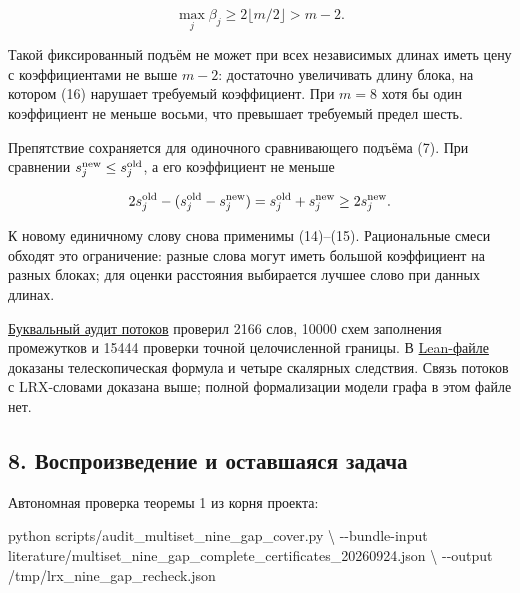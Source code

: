 \documentclass[
  11pt,
  a4paper,
]{article}
\newenvironment{Shaded}{}{}
\newcommand{\AttributeTok}[1]{\textcolor[rgb]{0.49,0.56,0.16}{#1}}
\newcommand{\DataTypeTok}[1]{\textcolor[rgb]{0.56,0.13,0.00}{#1}}
\newcommand{\ExtensionTok}[1]{#1}
\newcommand{\NormalTok}[1]{#1}
\begin{document}
\[\boxed{\max_j\beta_j\ge2\lfloor m/2\rfloor>m-2.}\tag{16}\]

Такой фиксированный подъём не может при всех независимых длинах иметь
цену с коэффициентами не выше \(m-2\): достаточно увеличивать длину
блока, на котором (16) нарушает требуемый коэффициент. При \(m=8\) хотя
бы один коэффициент не меньше восьми, что превышает требуемый предел
шесть.

Препятствие сохраняется для одиночного сравнивающего подъёма (7). При
сравнении \(s_j^{\rm new}\le s_j^{\rm old}\), а его коэффициент не
меньше

\[2s_j^{\rm old}-(s_j^{\rm old}-s_j^{\rm new})
=s_j^{\rm old}+s_j^{\rm new}\ge2s_j^{\rm new}.\]

К новому единичному слову снова применимы (14)--(15). Рациональные смеси
обходят это ограничение: разные слова могут иметь большой коэффициент на
разных блоках; для оценки расстояния выбирается лучшее слово при данных
длинах.

\href{literature/multiset_zero_flux_audit_20260924.json}{Буквальный
аудит потоков} проверил 2166 слов, 10000 схем заполнения промежутков и
15444 проверки точной целочисленной границы. В
\href{lean/MultisetZeroFlux.lean}{Lean-файле} доказаны телескопическая
формула и четыре скалярных следствия. Связь потоков с LRX-словами
доказана выше; полной формализации модели графа в этом файле нет.

\newpage

\hypertarget{ux432ux43eux441ux43fux440ux43eux438ux437ux432ux435ux434ux435ux43dux438ux435-ux438-ux43eux441ux442ux430ux432ux448ux430ux44fux441ux44f-ux437ux430ux434ux430ux447ux430}{%
\subsection{8. Воспроизведение и оставшаяся
задача}\label{ux432ux43eux441ux43fux440ux43eux438ux437ux432ux435ux434ux435ux43dux438ux435-ux438-ux43eux441ux442ux430ux432ux448ux430ux44fux441ux44f-ux437ux430ux434ux430ux447ux430}}

Автономная проверка теоремы 1 из корня проекта:

\begin{Shaded}
\begin{Highlighting}[]
\ExtensionTok{python}\NormalTok{ scripts/audit\_multiset\_nine\_gap\_cover.py }\DataTypeTok{\textbackslash{}}
  \AttributeTok{{-}{-}bundle{-}input}\NormalTok{ literature/multiset\_nine\_gap\_complete\_certificates\_20260924.json }\DataTypeTok{\textbackslash{}}
  \AttributeTok{{-}{-}output}\NormalTok{ /tmp/lrx\_nine\_gap\_recheck.json}
\end{Highlighting}
\end{Shaded}
\end{document}
